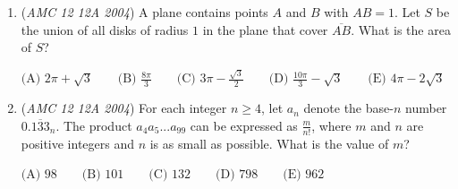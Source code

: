 \begin{enumerate}
 
 \[\sum_{k = 1}^{2004}{a_k} = \sum_{k = 1}^{2004}{b_k}.\]


 Which of the following quantities can be a nonzero number?


 $\text {(A) } c_0 \qquad \text {(B) } c_{2003} \qquad \text {(C) } b_2b_3...b_{2004} \qquad \text {(D) } \sum_{k = 1}^{2004}{a_k} \qquad \text {(E) }\sum_{k = 1}^{2004}{c_k}$


	\item (\textit{AMC 12 12A 2004}) A plane contains points $A$ and $B$ with $AB = 1$. Let $S$ be the union of all disks of radius $1$ in the plane that cover $\overline{AB}$. What is the area of $S$?


 $\text {(A) } 2\pi + \sqrt3 \qquad \text {(B) } \frac {8\pi}{3} \qquad \text {(C) } 3\pi - \frac {\sqrt3}{2} \qquad \text {(D) } \frac {10\pi}{3} - \sqrt3 \qquad \text {(E) }4\pi - 2\sqrt3$


	\item (\textit{AMC 12 12A 2004}) For each integer $n\geq 4$, let $a_n$ denote the base-$n$ number $0.\overline{133}_n$. The product $a_4a_5...a_{99}$ can be expressed as $\frac {m}{n!}$, where $m$ and $n$ are positive integers and $n$ is as small as possible. What is the value of $m$?


 $\text {(A) } 98 \qquad \text {(B) } 101 \qquad \text {(C) } 132\qquad \text {(D) } 798\qquad \text {(E) }962$


\end{enumerate}